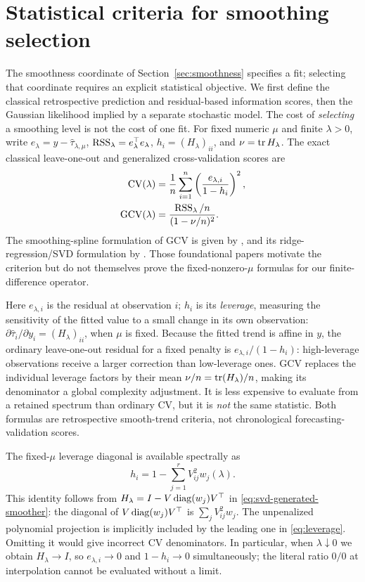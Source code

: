 \section{Statistical criteria for smoothing selection}\label{sec:criteria}
The smoothness coordinate of Section~\ref{sec:smoothness}
specifies a fit; selecting that coordinate requires an
explicit statistical objective.  We first define the
classical retrospective prediction and residual-based
information scores, then the Gaussian likelihood implied
by a separate stochastic model.
The cost of \emph{selecting} a smoothing level is not the cost of one fit. For fixed numeric $\mu$ and finite $\lambda>0$, write $e_\lambda=y-\widehat\tau_{\lambda,\mu}$, $\operatorname{RSS}_\lambda=e_\lambda^\top e_\lambda$, $h_i=(H_\lambda)_{ii}$, and $\nu=\operatorname{tr} H_\lambda$. The exact classical leave-one-out and generalized cross-validation scores are
\begin{equation}\label{eq:cvgcv}
\begin{aligned}
\operatorname{CV}(\lambda)&=\frac1n\sum_{i=1}^n
\left(\frac{e_{\lambda,i}}{1-h_i}\right)^2,\\
\operatorname{GCV}(\lambda)&=\frac{\operatorname{RSS}_\lambda/n}{(1-\nu/n)^2}.
\end{aligned}
\end{equation}
The smoothing-spline formulation of GCV is
given by \citet[Eq.~(1.9)]{craven1979},
and its ridge-regression/SVD formulation by
\citet[Secs.~1--2]{golub1979}.
Those foundational papers motivate the
criterion but do not themselves prove the
fixed-nonzero-$\mu$ formulas for our
finite-difference operator.

Here $e_{\lambda,i}$ is the residual at observation $i$;
$h_i$ is its \emph{leverage}, measuring the sensitivity of
the fitted value to a small change in its own observation:
$\partial\widehat\tau_i/\partial y_i=(H_\lambda)_{ii}$,
when $\mu$ is fixed. Because the fitted trend is affine in $y$,
the ordinary leave-one-out residual for a fixed penalty
is $e_{\lambda,i}/(1-h_i)$: high-leverage observations
receive a larger correction than low-leverage ones.
GCV replaces the individual leverage factors by their
mean $\nu/n=\operatorname{tr}(H_\lambda)/n$, making its denominator
a global complexity adjustment. It is less expensive
to evaluate from a retained spectrum than ordinary CV,
but it is \emph{not} the same statistic.
Both formulas are retrospective smooth-trend criteria,
not chronological forecasting-validation scores.

The fixed-$\mu$ leverage diagonal is available spectrally as
\begin{equation}\label{eq:leverage}
h_i=1-\sum_{j=1}^r V_{ij}^2 w_j(\lambda).
\end{equation}
This identity follows from
$H_\lambda=I-V\operatorname{diag}(w_j)V^\top$
in \eqref{eq:svd-generated-smoother}:
the diagonal of $V\operatorname{diag}(w_j)V^\top$ is
$\sum_jV_{ij}^2w_j$.
The unpenalized polynomial projection is
implicitly included by the leading one in
\eqref{eq:leverage}. Omitting it would give
incorrect CV denominators. In particular,
when $\lambda\downarrow0$ we obtain
$H_\lambda\to I$, so $e_{\lambda,i}\to0$
and $1-h_i\to0$ simultaneously; the
literal ratio $0/0$ at interpolation
cannot be evaluated without a limit.


